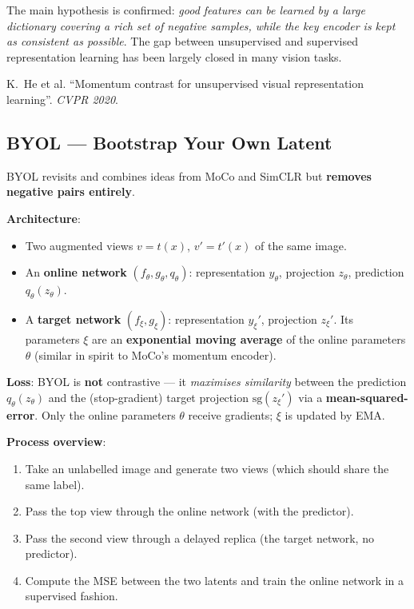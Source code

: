 \documentclass[11pt,a4paper]{article}
\theoremstyle{definition}
\theoremstyle{plain}
\theoremstyle{remark}
\begin{document}
The main hypothesis is confirmed: \emph{good features can be learned by a large dictionary covering a rich set of negative samples, while the key encoder is kept as consistent as possible}. The gap between unsupervised and supervised representation learning has been largely closed in many vision tasks.

\begin{tcolorbox}[colback=blue!5!white,colframe=blue!60!black,title={Reference}]
K.\ He et al. ``Momentum contrast for unsupervised visual representation learning''. \textit{CVPR 2020}.
\end{tcolorbox}

\subsection{BYOL --- Bootstrap Your Own Latent}

BYOL revisits and combines ideas from MoCo and SimCLR but \textbf{removes negative pairs entirely}.

\textbf{Architecture}:
\begin{itemize}
    \item Two augmented views $v = t(x)$, $v' = t'(x)$ of the same image.
    \item An \textbf{online network} $(f_\theta, g_\theta, q_\theta)$: representation $y_\theta$, projection $z_\theta$, prediction $q_\theta(z_\theta)$.
    \item A \textbf{target network} $(f_\xi, g_\xi)$: representation $y_\xi'$, projection $z_\xi'$. Its parameters $\xi$ are an \textbf{exponential moving average} of the online parameters $\theta$ (similar in spirit to MoCo's momentum encoder).
\end{itemize}

\textbf{Loss}: BYOL is \textbf{not} contrastive --- it \emph{maximises similarity} between the prediction $q_\theta(z_\theta)$ and the (stop-gradient) target projection $\mathrm{sg}(z_\xi')$ via a \textbf{mean-squared-error}. Only the online parameters $\theta$ receive gradients; $\xi$ is updated by EMA.

\textbf{Process overview}:
\begin{enumerate}
    \item Take an unlabelled image and generate two views (which should share the same label).
    \item Pass the top view through the online network (with the predictor).
    \item Pass the second view through a delayed replica (the target network, no predictor).
    \item Compute the MSE between the two latents and train the online network in a supervised fashion.
\end{enumerate}
\end{document}
